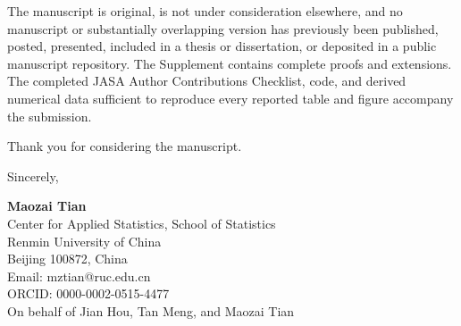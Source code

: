 \documentclass[
  10pt,
]{article}
\begin{document}
The manuscript is original, is not under consideration elsewhere, and no
manuscript or substantially overlapping version has previously been
published, posted, presented, included in a thesis or dissertation, or
deposited in a public manuscript repository. The Supplement contains
complete proofs and extensions. The completed JASA Author Contributions
Checklist, code, and derived numerical data sufficient to reproduce
every reported table and figure accompany the submission.

Thank you for considering the manuscript.

Sincerely,

\textbf{Maozai Tian}\\
Center for Applied Statistics, School of Statistics\\
Renmin University of China\\
Beijing 100872, China\\
Email: mztian@ruc.edu.cn\\
ORCID: 0000-0002-0515-4477\\
On behalf of Jian Hou, Tan Meng, and Maozai Tian
\end{document}
